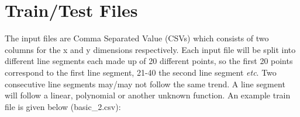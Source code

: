 \documentclass[12pt]{article}
\begin{document}
%
%
%
%


\section{Train/Test Files}
\label{sec:train_files}
The input files are Comma Separated Value (CSVs) which consists of two columns for the x and y dimensions respectively.
Each input file will be split into different line segments each made up of 20 different points, so the first 20 points correspond to the first line segment, 21-40 the second line segment \textit{etc}.
Two consecutive line segments may/may not follow the same trend.
A line segment will follow a linear, polynomial or another unknown function.
An example train file is given below (basic\_2.csv): 
\end{document}
